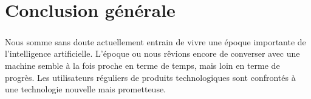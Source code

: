\chapter*{Conclusion générale}

\paragraph{}
Nous somme sans doute actuellement entrain de vivre une époque importante de l'intelligence artificielle. L'époque ou nous rêvions encore de converser avec une machine semble à la fois proche en terme de temps, mais loin en terme de progrès. Les utilisateurs réguliers de produits technologiques sont confrontés à une technologie nouvelle mais prometteuse.